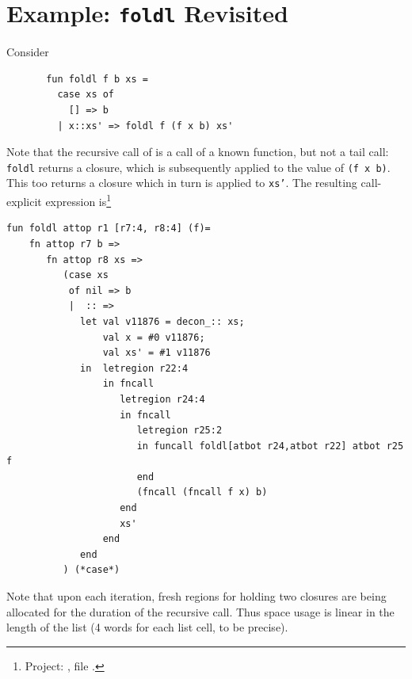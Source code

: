 \documentclass[12pt]{book}
\begin{document}
\section{Example: {\tt foldl}  Revisited}
\label{foldl.sec}
Consider
\begin{verbatim}
       fun foldl f b xs = 
         case xs of 
           [] => b
         | x::xs' => foldl f (f x b) xs'
\end{verbatim}
Note that the recursive call of  is a call of a known function, but not a tail
call: {\tt foldl} returns a closure, which is subsequently
applied to the value of {\tt (f x b)}. This too returns a closure
which in turn is applied to {\tt xs'}. 
The resulting call-explicit expression is\footnote{Project:
, file .}

\begin{verbatim}
fun foldl attop r1 [r7:4, r8:4] (f)= 
    fn attop r7 b => 
       fn attop r8 xs => 
          (case xs 
           of nil => b
           |  :: => 
             let val v11876 = decon_:: xs; 
                 val x = #0 v11876; 
                 val xs' = #1 v11876
             in  letregion r22:4 
                 in fncall 
                    letregion r24:4 
                    in fncall 
                       letregion r25:2 
                       in funcall foldl[atbot r24,atbot r22] atbot r25 f 
                       end
                       (fncall (fncall f x) b) 
                    end
                    xs' 
                 end
             end 
          ) (*case*) 
\end{verbatim}
Note that upon each iteration, fresh regions for holding
two closures are being allocated for the duration of the
recursive call. Thus space usage is linear in the length 
of the list (4 words for each list cell, to be precise).
\end{document}
